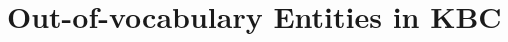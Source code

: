 \documentclass[11pt,a4paper]{article}
\newcommand{\onetoone}{\textsc{1-to-1}\xspace}
\newcommand{\oneton}{\textsc{1-to-N}\xspace}
\newcommand{\ntoone}{\textsc{N-to-1}\xspace}
\newcommand{\nton}{\textsc{N-to-N}\xspace}
\begin{document}

\section{Out-of-vocabulary Entities in KBC}
\end{document}

